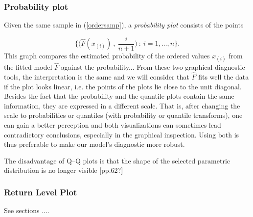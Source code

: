 \documentclass[11pt,a4paper,openany ]{book}
\begin{document}
\subsubsection*{Probability plot} Given the same sample in (\ref{ordersamp}), a \emph{probability plot} consists of the points 

\begin{equation}
\Bigg\{\bigg(\hat{F}(x_{(i)})\ ,\ \frac{i}{n+1}\bigg) \ : \ i=1,\dots,n\Bigg\}.
\end{equation}
This graph compares the estimated probability of the ordered values $x_{(i)}$ from the fitted model $\hat{F}$ against the probability...
\newline
From these two graphical diagnostic tools, the interpretation is the same and we will consider that $\hat{F}$ fits well the data if the plot looks linear, i.e. the points of the plots lie close to the unit diagonal.
\newline
Besides the fact that the probability and the quantile plots contain the same information, they are expressed in a different scale. That is, after changing the scale to probabilities or quantiles (with probability or quantile transforms), one can gain a better perception and both visualizations can sometimes lead contradictory conclusions, especially in the graphical inspection. Using both is thus preferable to make our model's diagnostic more robust.

The disadvantage of Q–Q plots is that the shape of the selected
parametric distribution is no longer visible \cite{beirlant_statistics_2006}[pp.62?]


\subsubsection*{Return Level Plot}

See sections ....
\end{document}
